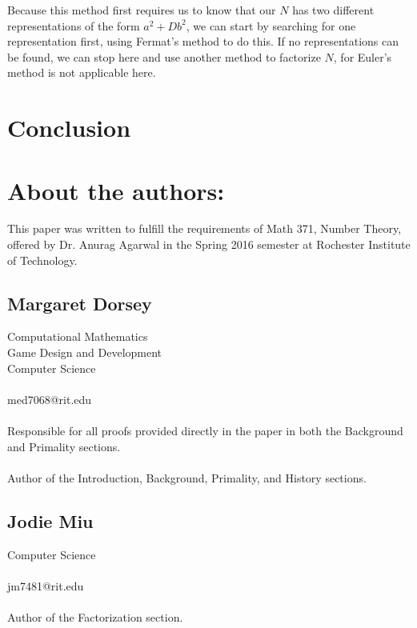 \documentclass{article}
\begin{document}
\par Because this method first requires us to know that our $N$ has two different representations of the form $a^2+Db^2$,
we can start by searching for one representation first, using Fermat's method to do this. If no representations can
be found, we can stop here and use another method to factorize $N$, for Euler's method is not applicable here.


\section{Conclusion}\label{Conclusion}

\newpage

\nocite{*}
         






\section*{About the authors:}


\par This paper was written to fulfill the requirements of Math 371, Number Theory, offered by Dr. Anurag Agarwal
in the Spring 2016 semester at Rochester Institute of Technology.
\subsection*{Margaret Dorsey}
   Computational Mathematics
   \\Game Design and Development
   \\Computer Science
   \\
   \\ med7068@rit.edu
  \\
  \\ Responsible for all proofs provided directly in the paper in both the Background and Primality sections.
  \\
  \\ Author of the Introduction, Background, Primality, and History sections.

\subsection*{Jodie Miu}
   Computer Science
   \\
   \\ jm7481@rit.edu 
   \\
   \\ Author of the Factorization section.
   
\end{document}
